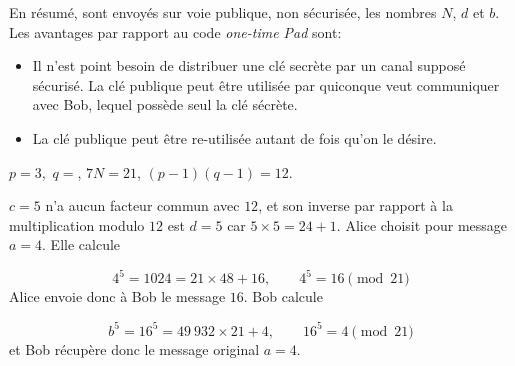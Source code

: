 En résumé, sont envoyés sur voie publique, non sécurisée, les nombres $N$, $d$
et $b$. Les avantages par rapport au code \emph{one-time Pad} sont:

\begin{itemize}
\item Il n'est point besoin de distribuer une clé secrète par un canal supposé
sécurisé. La clé publique peut être utilisée par quiconque veut communiquer
avec Bob, lequel possède seul la clé sécrète.

\item La clé publique peut être re-utilisée autant de fois qu'on le désire.
\end{itemize}

\begin{example}
$p=3$,\ $q=$, $7N=21$, $(p-1)(q-1)=12$.

$c=5$ n'a aucun facteur commun avec $12$, et son inverse par rapport à la
multiplication modulo $12$ est $d=5$ car $5\times5=24+1$. Alice choisit pour
message $a=4$. Elle calcule

\begin{equation}
4^{5}=1024=21\times48+16,\qquad4^{5}=16\pmod{21}
\end{equation}
Alice envoie donc à Bob le message $16$. Bob calcule

\begin{equation}
b^{5}=16^{5}=49\ 932\times21+4,\qquad16^{5}=4\pmod{21}
\end{equation}
et Bob récupère donc le message original $a=4$.
\end{example}


